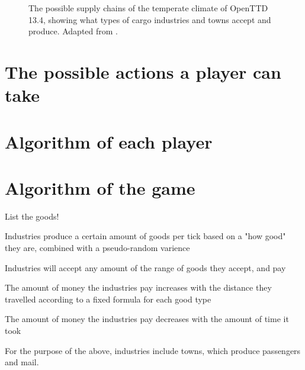 \documentclass[logo,msc,dsti]{infthesis}    %
\begin{document}
{\begin{figure}[h]
\caption{The possible supply chains of the temperate climate of OpenTTD 13.4, showing what types of cargo industries and towns accept and produce. Adapted from \cite{TemperateFlowChart}.}
\label{figure:temperate-supply-chains}
\end{figure}

\section{The possible actions a player can take}

\section{Algorithm of each player}

\section{Algorithm of the game}



List the goods!

\begin{itemize}
\begin{item}Industries produce a certain amount of goods per tick based on a "how good" they are, combined with a pseudo-random varience\end{item}
\begin{item}Industries will accept any amount of the range of goods they accept, and pay\end{item}
\begin{item}The amount of money the industries pay increases with the distance they travelled according to a fixed formula for each good type\end{item}
\begin{item}The amount of money the industries pay decreases with the amount of time it took\end{item}
\end{itemize}

For the purpose of the above, industries include towns, which produce passengers and mail.

}
\end{document}
